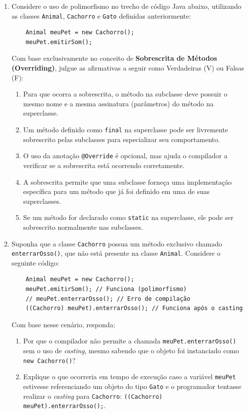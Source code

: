 \documentclass[12pt,a4paper]{article}
\newcommand{\resposta}[1]{
\noindent
\framebox[\textwidth]{
\begin{minipage}{0.98\textwidth}
\vspace{#1}
\end{minipage}
}
}
\begin{document}
\begin{enumerate}
    \resposta{6cm}

    \item Considere o uso de polimorfismo no trecho de código Java abaixo, utilizando as classes \texttt{Animal}, \texttt{Cachorro} e \texttt{Gato} definidas anteriormente:
    
    \begin{verbatim}
    Animal meuPet = new Cachorro();
    meuPet.emitirSom();
    \end{verbatim}

    Com base exclusivamente no conceito de \textbf{Sobrescrita de Métodos (Overriding)}, julgue as afirmativas a seguir como Verdadeiras (V) ou Falsas (F):

    \begin{enumerate}[label=( \quad )]
        \item Para que ocorra a sobrescrita, o método na subclasse deve possuir o mesmo nome e a mesma assinatura (parâmetros) do método na superclasse.
        \item Um método definido como \texttt{final} na superclasse pode ser livremente sobrescrito pelas subclasses para especializar seu comportamento.
        \item O uso da anotação \texttt{@Override} é opcional, mas ajuda o compilador a verificar se a sobrescrita está ocorrendo corretamente.
        \item A sobrescrita permite que uma subclasse forneça uma implementação específica para um método que já foi definido em uma de suas superclasses.
        \item Se um método for declarado como \texttt{static} na superclasse, ele pode ser sobrescrito normalmente nas subclasses.
    \end{enumerate}

    \item Suponha que a classe \texttt{Cachorro} possua um método exclusivo chamado \texttt{enterrarOsso()}, que não está presente na classe \texttt{Animal}. Considere o seguinte código:

    \begin{verbatim}
    Animal meuPet = new Cachorro();
    meuPet.emitirSom(); // Funciona (polimorfismo)
    // meuPet.enterrarOsso(); // Erro de compilação
    ((Cachorro) meuPet).enterrarOsso(); // Funciona após o casting
    \end{verbatim}

    Com base nesse cenário, responda:
    
    \begin{enumerate}[label=\alph*)]
        \item Por que o compilador não permite a chamada \texttt{meuPet.enterrarOsso()} sem o uso de \textit{casting}, mesmo sabendo que o objeto foi instanciado como \texttt{new Cachorro()}?
        \item Explique o que ocorreria em tempo de execução caso a variável \texttt{meuPet} estivesse referenciando um objeto do tipo \texttt{Gato} e o programador tentasse realizar o \textit{casting} para \texttt{Cachorro}: \texttt{((Cachorro) meuPet).enterrarOsso();}.
    \end{enumerate}
    

\end{enumerate}
\end{document}
